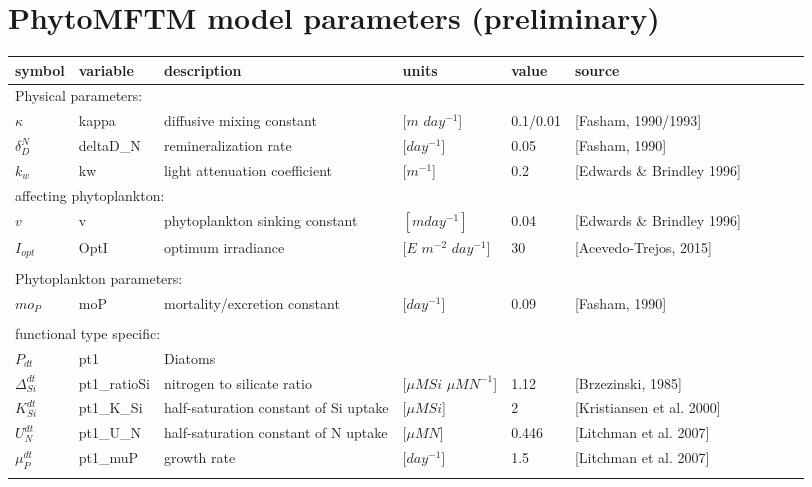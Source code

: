 \thispagestyle{empty}

\section*{PhytoMFTM model parameters (preliminary)}

\noindent
\begin{tabular}{llllllllll}

  symbol               & variable   & description & units   & value      & source\\
  \hline
  \multicolumn{3}{l}{Physical parameters:}\\
  \hline
  $\kappa$ & kappa & diffusive mixing constant & [$m$ $day^{-1}$] & 0.1/0.01 & [Fasham, 1990/1993]\\
  $\delta^{N}_{D}$ & deltaD\_N  & remineralization rate & [$day^{-1}$] & 0.05 & [Fasham, 1990]\\
  $k_w$ & kw & light attenuation coefficient & [$m^{-1}$] & 0.2 & [Edwards \& Brindley 1996]\\                           
  \multicolumn{3}{l}{affecting phytoplankton:} \\
  $v$ & v &  phytoplankton sinking constant & $[m day^{-1}]$ & 0.04 & [Edwards \& Brindley 1996]\\                      
  $I_{opt}$ & OptI & optimum irradiance & [$E$ $m^{-2}$ $day^{-1}$] & 30 & [Acevedo-Trejos, 2015]\\
  \\
  \hline
  \multicolumn{3}{l}{Phytoplankton parameters:}\\
  \hline
  $mo_P$ & moP &  mortality/excretion constant & [$day^{-1}$] & 0.09 & [Fasham, 1990]\\
  \\
  \multicolumn{3}{l}{functional type specific:} \\
  $P_{dt}$ & pt1  & Diatoms\\
  \hline
  $\Delta^{dt}_{Si}$ & pt1\_ratioSi & nitrogen to silicate ratio & [$\mu M Si$ $\mu M N^{-1}$] & 1.12 & [Brzezinski, 1985]  \\
  $K^{dt}_{Si}$ & pt1\_K\_Si & half-saturation constant of Si uptake & [$\mu M Si$] & 2 & [Kristiansen et al. 2000]\\
  $U^{dt}_N$ & pt1\_U\_N & half-saturation constant of N uptake & [$\mu M N$] &  0.446 & [Litchman et al. 2007]\\
  $\mu^{dt}_P$ & pt1\_muP & growth rate & [$day^{-1}$] & 1.5 & [Litchman et al. 2007]\\
  \\

\end{tabular}
